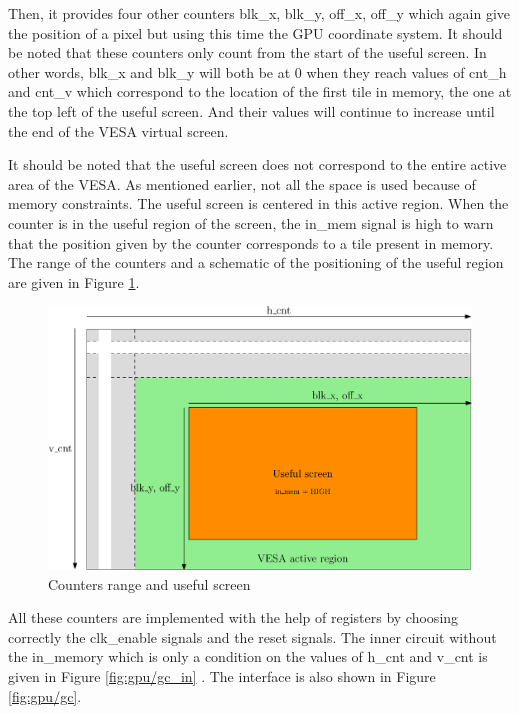 Then, it provides four other counters blk\_x, blk\_y, off\_x, off\_y which again give the position 
of a pixel but using this time the GPU coordinate system. It should be noted that these counters 
only count from the start of the useful screen. In other words, blk\_x and blk\_y will both be at 0 
when they reach values of cnt\_h and cnt\_v which correspond to the location of the first tile in 
memory, the one at the top left of the useful screen. And their values will continue to increase 
until the end of the VESA virtual screen.

It should be noted that the useful screen does not correspond to the entire active area of the 
VESA. As mentioned earlier, not all the space is used because of memory constraints. The useful 
screen is centered in this active region. When the counter is in the useful region of the screen, 
the in\_mem signal is high to warn that the position given by the counter corresponds to a tile 
present in memory. The range of the counters and a schematic of the positioning of the useful 
region are given in Figure \ref{fig:gpu/gc_screen}.

\begin{figure}[H]
    \centering
    \includegraphics[width=\linewidth]{Chapter4-GPU_CLKU/res/gc_screen}
    \caption{Counters range and useful screen}
    \label{fig:gpu/gc_screen}
\end{figure}

All these counters are implemented with the help of registers by choosing correctly the clk\_enable 
signals and the reset signals. The inner circuit without the in\_memory which is only a condition 
on the values of h\_cnt and v\_cnt is given in Figure \ref{fig:gpu/gc_in}
. The interface is also shown in Figure \ref{fig:gpu/gc}.

